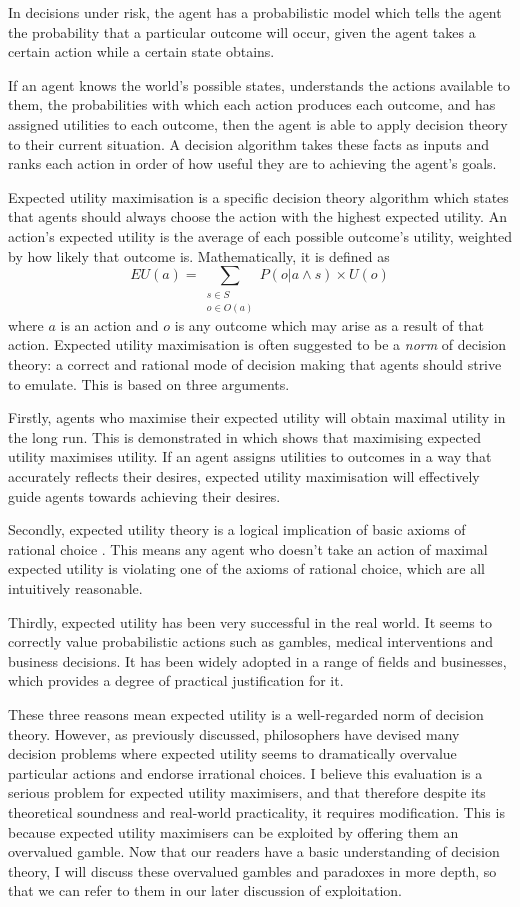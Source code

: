 \documentclass{article}
\begin{document}
In decisions under risk, the agent has a probabilistic model which tells the agent the probability that a particular outcome will occur, given the agent takes a certain action while a certain state obtains.

If an agent knows the world's possible states, understands the actions available to them, the probabilities with which each action produces each outcome, and has assigned utilities to each outcome, then the agent is able to apply decision theory to their current situation. A decision algorithm takes these facts as inputs and ranks each action in order of how useful they are to achieving the agent's goals. 

Expected utility maximisation is a specific decision theory algorithm which states that agents should always choose the action with the highest expected utility. An action's expected utility is the average of each possible outcome's utility, weighted by how likely that outcome is. Mathematically, it is defined as
\[EU(a)=\sum_{\substack{s\in S \\ o \in O(a)}}P(o|a \wedge s)\times U(o)\]
where \(a\) is an action and \(o\) is any outcome which may arise as a result of that action. Expected utility maximisation is often suggested to be a \textit{norm} of decision theory: a correct and rational mode of decision making that agents should strive to emulate. This is based on three arguments.

Firstly, agents who maximise their expected utility will obtain maximal utility in the long run. This is demonstrated in \citep{von1944games} which shows that maximising expected utility maximises utility. If an agent assigns utilities to outcomes in a way that accurately reflects their desires, expected utility maximisation will effectively guide agents towards achieving their desires. 

Secondly, expected utility theory is a logical implication of basic axioms of rational choice \citep{von1944games}. This means any agent who doesn't take an action of maximal expected utility is violating one of the axioms of rational choice, which are all intuitively reasonable.

Thirdly, expected utility has been very successful in the real world. It seems to correctly value probabilistic actions such as gambles, medical interventions and business decisions. It has been widely adopted in a range of fields and businesses, which provides a degree of practical justification for it.

These three reasons mean expected utility is a well-regarded norm of decision theory. However, as previously discussed, philosophers have devised many decision problems where expected utility seems to dramatically overvalue particular actions and endorse irrational choices. I believe this evaluation is a serious problem for expected utility maximisers, and that therefore despite its theoretical soundness and real-world practicality, it requires modification. This is because expected utility maximisers can be exploited by offering them an overvalued gamble. Now that our readers have a basic understanding of decision theory, I will discuss these overvalued gambles and paradoxes in more depth, so that we can refer to them in our later discussion of exploitation.
\end{document}
